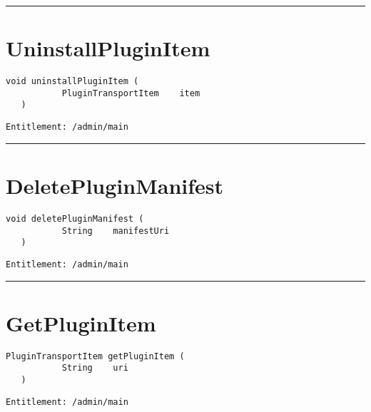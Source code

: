 \rule{12cm}{2pt}
\section{UninstallPluginItem}
\label{Api:UninstallPluginItem}
\begin{lstlisting}[style=nonumbers]
   void uninstallPluginItem (
           PluginTransportItem    item
   )
\end{lstlisting}
\begin{Verbatim}[formatcom=\color{Maroon}]
  Entitlement: /admin/main
\end{Verbatim}



\rule{12cm}{2pt}
\section{DeletePluginManifest}
\label{Api:DeletePluginManifest}
\begin{lstlisting}[style=nonumbers]
   void deletePluginManifest (
           String    manifestUri
   )
\end{lstlisting}
\begin{Verbatim}[formatcom=\color{Maroon}]
  Entitlement: /admin/main
\end{Verbatim}



\rule{12cm}{2pt}
\section{GetPluginItem}
\label{Api:GetPluginItem}
\begin{lstlisting}[style=nonumbers]
   PluginTransportItem getPluginItem (
           String    uri
   )
\end{lstlisting}
\begin{Verbatim}[formatcom=\color{Maroon}]
  Entitlement: /admin/main
\end{Verbatim}



